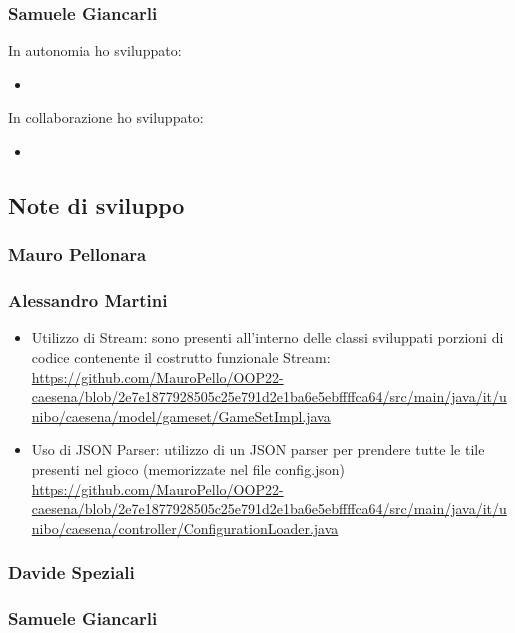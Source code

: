\subsubsection*{Samuele Giancarli}
In autonomia ho sviluppato:
\begin{itemize}
    \item 
\end{itemize}
In collaborazione ho sviluppato:
\begin{itemize}
    \item 
\end{itemize}

\subsection{Note di sviluppo}
\subsubsection*{Mauro Pellonara} 

\subsubsection*{Alessandro Martini}
\begin{itemize}
    \item Utilizzo di Stream: sono presenti all'interno delle classi sviluppati porzioni di codice contenente il costrutto funzionale Stream: \url{https://github.com/MauroPello/OOP22-caesena/blob/2e7e1877928505c25e791d2e1ba6e5ebffffca64/src/main/java/it/unibo/caesena/model/gameset/GameSetImpl.java}
    \item Uso di JSON Parser: utilizzo di un JSON parser per prendere tutte le tile presenti nel gioco (memorizzate nel file config.json) \url{https://github.com/MauroPello/OOP22-caesena/blob/2e7e1877928505c25e791d2e1ba6e5ebffffca64/src/main/java/it/unibo/caesena/controller/ConfigurationLoader.java}
\end{itemize}

\subsubsection*{Davide Speziali}

\subsubsection*{Samuele Giancarli}
